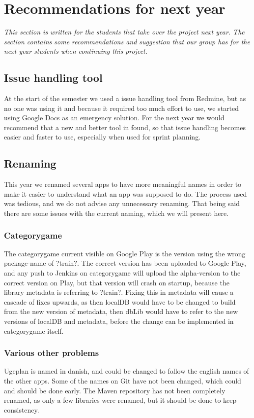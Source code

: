 \chapter{Recommendations for next year}
\textit{This section is written for the students that take over the project next year. The section contains some recommendations and suggestion that our group has for the next year students when continuing this project.}

\section{Issue handling tool}
At the start of the semester we used a issue handling tool from Redmine, but as no one was using it and because it required too much effort to use, we started using Google Docs as an emergency solution. For the next year we would recommend that a new and better tool in found, so that issue handling becomes easier and faster to use, especially when used for sprint planning.

\section{Renaming}
This year we renamed several apps to have more meaningful names in order to make it easier to understand what an app was supposed to do. The process used was tedious, and we do not advise any unnecessary renaming. That being said there are some issues with the current naming, which we will present here.

\subsection{Categorygame}
The categorygame current visible on Google Play is the version using the wrong package-name of ?train?. The correct version has been uploaded to Google Play, and any push to Jenkins on categorygame will upload the alpha-version to the correct version on Play, but that version will crash on startup, because the library metadata is referring to ?train?. Fixing this in metadata will cause a cascade of fixes upwards, as then localDB would have to be changed to build from the new version of metadata, then dbLib would have to refer to the new versions of localDB and metadata, before the change can be implemented in categorygame itself.

\subsection{Various other problems}
Ugeplan is named in danish, and could be changed to follow the english names of the other apps.
Some of the names on Git have not been changed, which could and should be done early.
The Maven repository has not been completely renamed, as only a few libraries were renamed, but it should be done to keep consistency.

